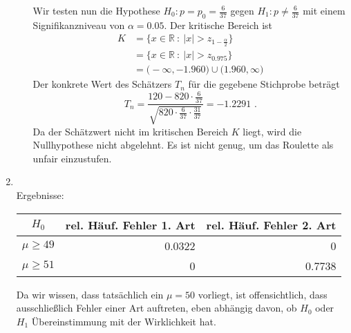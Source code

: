 \documentclass[a4paper]{scrartcl}
\def \blattnr {9}
\begin{document}
\begin{enumerate}[label=\bfseries \blattnr.\arabic*]
\begin{enumerate}
                Wir testen nun die Hypothese $H_0 \colon p = p_0 =
                \frac{6}{37}$ gegen $H_1 \colon p \neq \frac{6}{37}$ mit einem
                Signifikanzniveau von $\alpha = \num{0,05}$.
                Der kritische Bereich ist
                \begin{equation*}
                    \begin{split}
                        K
                        &= \{ x \in \mathbb{R}\ :\ |x| > z_{1-\frac{\alpha}{2}} \} \\
                        &= \{ x \in \mathbb{R}\ :\ |x| > z_{\num{0,975}} \} \\
                        &= \Big( -\infty, \num{-1,960} \Big) \cup \Big( \num{1,960}, \infty \Big)
                    \end{split}
                \end{equation*}
                Der konkrete Wert des Schätzers $T_n$ für die gegebene
                Stichprobe beträgt
                \begin{equation*}
                    T_n
                    = \frac{120 - 820 \cdot \frac{6}{37}}{\sqrt{820 \cdot \frac{6}{37} \cdot \frac{31}{37}}}
                    = \num{-1,2291}
                    \text{ .}
                \end{equation*}
                Da der Schätzwert nicht im kritischen Bereich $K$ liegt, wird
                die Nullhypothese nicht abgelehnt. Es ist nicht genug, um das
                Roulette als unfair einzustufen.
	
        \end{enumerate}

    \pagebreak
    \item \hfill \\ 
      
      
      \pagebreak
      Ergebnisse:
      
      \begin{tabular}{c|r|r}
       $H_0$ & rel. Häuf. Fehler 1. Art & rel. Häuf. Fehler 2. Art \\
       \hline
       $\mu \geq 49$ & 0.0322 & 0 \\
       $\mu \geq 51$ & 0 & 0.7738
      \end{tabular}
      
      Da wir wissen, dass tatsächlich ein $\mu=50$ vorliegt, ist offensichtlich, 
      dass ausschließlich Fehler einer Art auftreten, eben abhängig davon, ob $H_0$ 
      oder $H_1$ Übereinstimmung mit der Wirklichkeit hat.
      

\end{enumerate}
\end{document}

